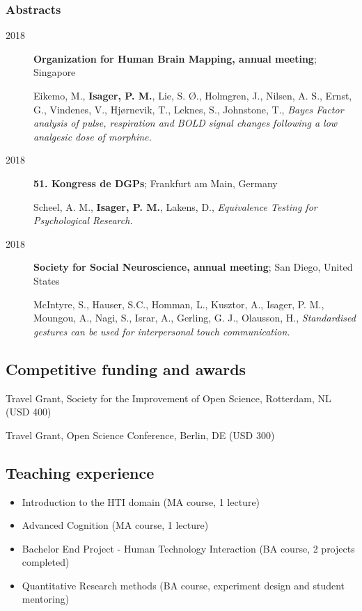 \documentclass[]{article}
\providecommand{\tightlist}{%
  \setlength{\itemsep}{0pt}\setlength{\parskip}{0pt}}
\begin{document}
\subsubsection{Abstracts}\label{abstracts}

\begin{description}
\item[2018]
\textbf{Organization for Human Brain Mapping, annual meeting}; Singapore

Eikemo, M., \textbf{Isager, P. M.}, Lie, S. Ø., Holmgren, J., Nilsen, A.
S., Ernst, G., Vindenes, V., Hjørnevik, T., Leknes, S., Johnstone, T.,
\emph{Bayes Factor analysis of pulse, respiration and BOLD signal
changes following a low analgesic dose of morphine.}
\item[2018]
\textbf{51. Kongress de DGPs}; Frankfurt am Main, Germany

Scheel, A. M., \textbf{Isager, P. M.}, Lakens, D., \emph{Equivalence
Testing for Psychological Research.}
\item[2018]
\textbf{Society for Social Neuroscience, annual meeting}; San Diego,
United States

McIntyre, S., Hauser, S.C., Homman, L., Kusztor, A., Isager, P. M.,
Moungou, A., Nagi, S., Israr, A., Gerling, G. J., Olausson, H.,
\emph{Standardised gestures can be used for interpersonal touch
communication.}
\end{description}

\subsection{Competitive funding and
awards}\label{competitive-funding-and-awards}

Travel Grant, Society for the Improvement of Open Science, Rotterdam, NL
(USD 400)

Travel Grant, Open Science Conference, Berlin, DE (USD 300)

\subsection{Teaching experience}\label{teaching-experience}

\begin{itemize}
\tightlist
\item
  Introduction to the HTI domain (MA course, 1 lecture)
\item
  Advanced Cognition (MA course, 1 lecture)
\item
  Bachelor End Project - Human Technology Interaction (BA course, 2
  projects completed)
\item
  Quantitative Research methods (BA course, experiment design and
  student mentoring)
\end{itemize}
\end{document}
